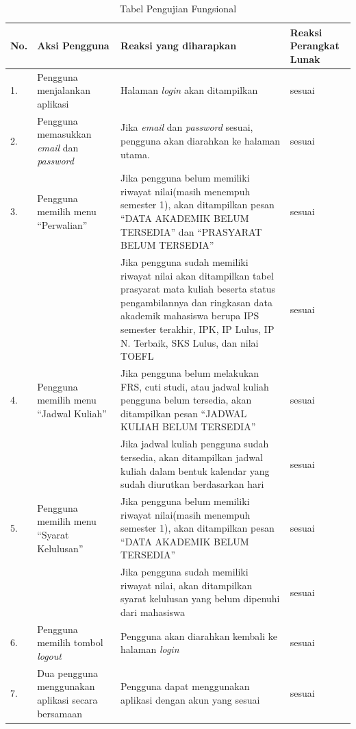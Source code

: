 			\begin{table}[H]
			\centering
			\caption{Tabel Pengujian Fungsional}
				\begin{tabular}{|p{0.25cm}| p{3.5cm}| p{7cm}| p{2.5cm}|} \hline
				No.	&	Aksi Pengguna	&	Reaksi yang diharapkan	&	Reaksi Perangkat Lunak \\ \hline
				1.	&	Pengguna menjalankan aplikasi	&	Halaman \textit{login} akan ditampilkan	&	sesuai	\\ \hline
				2.	&	Pengguna memasukkan \textit{email} dan \textit{password}	&	Jika \textit{email} dan \textit{password}	sesuai, pengguna akan diarahkan ke halaman utama. & sesuai\\ \hline
				3.	&	Pengguna memilih menu ``Perwalian'' &	Jika pengguna belum memiliki riwayat nilai(masih menempuh semester 1), akan ditampilkan pesan ``DATA AKADEMIK BELUM TERSEDIA'' dan ``PRASYARAT BELUM TERSEDIA''	&	sesuai	\\ \hline
					&	&	Jika pengguna sudah memiliki riwayat nilai	akan ditampilkan tabel prasyarat mata kuliah beserta status pengambilannya dan ringkasan data akademik mahasiswa berupa IPS semester terakhir, IPK, IP Lulus, IP N. Terbaik, SKS Lulus, dan nilai TOEFL &	sesuai	\\ \hline
				4.	&	Pengguna memilih menu ``Jadwal Kuliah'' &	Jika pengguna belum melakukan FRS, cuti studi, atau jadwal kuliah pengguna belum tersedia, akan ditampilkan pesan ``JADWAL KULIAH BELUM TERSEDIA''	&	sesuai	\\ \hline
					&	&	Jika jadwal kuliah pengguna sudah tersedia, akan ditampilkan jadwal kuliah dalam bentuk kalendar yang sudah diurutkan berdasarkan hari &	sesuai	\\ \hline
				5.	&	Pengguna memilih menu ``Syarat Kelulusan'' &	Jika pengguna belum memiliki riwayat nilai(masih menempuh semester 1), akan ditampilkan pesan ``DATA AKADEMIK BELUM TERSEDIA'' &	sesuai	\\ \hline
					&	&	Jika pengguna sudah memiliki riwayat nilai, akan ditampilkan syarat kelulusan yang belum dipenuhi dari mahasiswa &	sesuai	\\ \hline
				6.	&	Pengguna memilih tombol \textit{logout}	&	Pengguna akan diarahkan kembali ke halaman \textit{login} &	sesuai	\\ \hline
				7.	& Dua pengguna menggunakan aplikasi secara bersamaan	&	Pengguna dapat menggunakan aplikasi dengan akun yang sesuai &	sesuai	\\ \hline
				\end{tabular}
				\label{table:hasilFungsional}
			\end{table}
			
